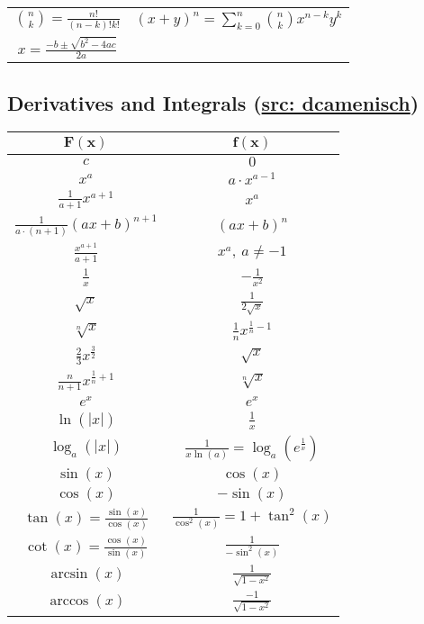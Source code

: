 \begin{center}
  \begin{tabular}{cc}
    \(\binom{n}{k} = \frac{n!}{(n-k)!k!}\) & \((x + y)^n = \sum\limits_{k=0}^n \binom{n}{k}x^{n-k}y^k\) \\
    \(x = \frac{-b \pm \sqrt{b^2 - 4ac}}{2a}\)
  \end{tabular}
\end{center}

\subsection*{Derivatives and Integrals (\href{https://n.ethz.ch/~dcamenisch/summaries/}{src: dcamenisch})}
\renewcommand{\arraystretch}{1.5}
\begin{center}
\begin{tabular}{c|c}
    $\mathbf{F(x)}$ & $\mathbf{f(x)}$ \\
    \midrule
    $c$ & $0$ \\
    $x^a$ & $a \cdot x^{a - 1}$ \\
    $\frac{1}{a+1} x^{a + 1}$ & $x^a$ \\
    $\frac{1}{a \cdot (n + 1)} (ax + b)^{n + 1}$ & $(ax + b)^n$ \\
    $\frac{x^{a + 1}}{a + 1}$ & $x^a, \ a \neq -1$ \\
    $\frac{1}{x}$ & $-\frac{1}{x^2}$ \\
    $\sqrt{x}$ & $\frac{1}{2\sqrt{x}}$ \\
    $\sqrt[n]{x}$ & $\frac{1}{n}x^{\frac{1}{n} - 1}$ \\
    $\frac{2}{3}x^{\frac{3}{2}}$ & $\sqrt{x}$ \\
    $\frac{n}{n+1} x^{\frac{1}{n} + 1}$ & $\sqrt[n]{x}$ \\
    $e^x$ & $e^x$ \\
    $\ln(|x|)$ & $\frac{1}{x}$ \\
    $\log_a(|x|)$ & $\frac{1}{x \ln(a)} = \log_a(e^\frac{1}{x})$ \\
    $\sin(x)$ & $\cos(x)$ \\
    $\cos(x)$ & $-\sin(x)$ \\
    $\tan(x) = \frac{\sin(x)}{\cos(x)}$ & $\frac{1}{\cos^2(x)} = 1 + \tan^2(x)$ \\
    $\cot(x) = \frac{\cos(x)}{\sin(x)}$ & $\frac{1}{-\sin^2(x)}$ \\
    $\arcsin(x)$ & $\frac{1}{\sqrt{1 - x^2}}$ \\
    $\arccos(x)$ & $\frac{-1}{\sqrt{1 - x^2}}$ \\

\end{tabular}
\end{center}
